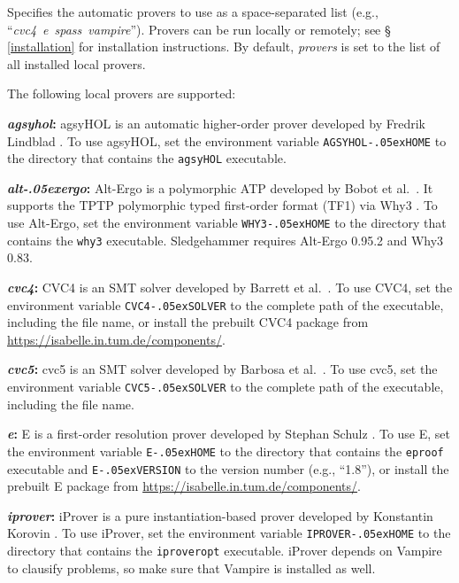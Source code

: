 \documentclass[a4paper,12pt]{article}
\newcommand\download{\url{https://isabelle.in.tum.de/components/}}
\let\oldS=\S
\def\S{\oldS\,}
\renewcommand\_{\hbox{\textunderscore\kern-.05ex}}
\begin{document}
\begin{enum}
Specifies the automatic provers to use as a space-separated list (e.g.,
``\textit{cvc4}~\textit{e}~\textit{spass}~\textit{vampire\/}'').
Provers can be run locally or remotely; see \S\ref{installation} for
installation instructions. By default, \textit{provers} is set to the list of
all installed local provers.

The following local provers are supported:

\begin{sloppy}
\begin{enum}
\item[\labelitemi] \textbf{\textit{agsyhol}:} agsyHOL is an automatic
higher-order prover developed by Fredrik Lindblad \cite{agsyHOL}. To use
agsyHOL, set the environment variable \texttt{AGSYHOL\_HOME} to the directory
that contains the \texttt{agsyHOL} executable.

\item[\labelitemi] \textbf{\textit{alt\_ergo}:} Alt-Ergo is a polymorphic
ATP developed by Bobot et al.\ \cite{alt-ergo}.
It supports the TPTP polymorphic typed first-order format (TF1) via Why3
\cite{why3}. To use Alt-Ergo, set the environment variable \texttt{WHY3\_HOME}
to the directory that contains the \texttt{why3} executable. Sledgehammer
requires Alt-Ergo 0.95.2 and Why3 0.83.

\item[\labelitemi] \textbf{\textit{cvc4}:} CVC4 is an SMT solver developed by
Barrett et al.\ \cite{cvc4}. To use CVC4,
set the environment variable \texttt{CVC4\_SOLVER} to the complete path of the
executable, including the file name, or install the prebuilt CVC4 package from
\download.

\item[\labelitemi] \textbf{\textit{cvc5}:} cvc5 is an SMT solver developed by
Barbosa et al.\ \cite{barbosa-et-al-cvc5}. To use cvc5,
set the environment variable \texttt{CVC5\_SOLVER} to the complete path of the
executable, including the file name.

\item[\labelitemi] \textbf{\textit{e}:} E is a first-order resolution prover
developed by Stephan Schulz \cite{schulz-2019}. To use E, set the environment
variable \texttt{E\_HOME} to the directory that contains the \texttt{eproof}
executable and \texttt{E\_VERSION} to the version number (e.g., ``1.8''), or
install the prebuilt E package from \download.

\item[\labelitemi] \textbf{\textit{iprover}:} iProver is a pure
instantiation-based prover developed by Konstantin Korovin \cite{korovin-2009}.
To use iProver, set the environment variable \texttt{IPROVER\_HOME} to the
directory that contains the \texttt{iproveropt} executable. iProver depends on
Vampire to clausify problems, so make sure that Vampire is installed as well.


\end{enum}
\end{sloppy}
\end{enum}
\end{document}
